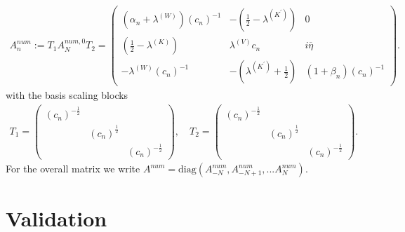 \documentclass[12pt,journal,compsoc, onecolumn]{IEEEtran}
\begin{document}
\begin{align}
    \label{eq:galerkin_matrix}
    {A}^{num}_n := T_1 A^{num, 0}_N T_2 = 
    \begin{pmatrix}
    (\alpha_n + \lambda^{(W)})(c_n)^{-1} & - (\frac{1}{2} - \lambda^{(K^\prime)}) & 0 \\
    (\frac{1}{2} -  \lambda^{(K)}) &  \lambda^{(V)}c_n & i \overline{\eta} \\ 
    -  \lambda^{(W)}(c_n)^{-1} & - ( \lambda^{(K^\prime)} + \frac{1}{2}) & (1 + \beta_n)(c_n)^{-1}
\end{pmatrix}.
\end{align}
with the basis scaling blocks \begin{align}
    T_1 = 
    \begin{pmatrix}
    (c_n)^{-\frac{1}{2}} & & \\
    &  (c_n)^{\frac{1}{2}} & \\
    & &  (c_n)^{-\frac{1}{2}}
    \end{pmatrix}, \quad
    T_2 = 
    \begin{pmatrix}
    (c_n)^{-\frac{1}{2}} & & \\
    &  (c_n)^{\frac{1}{2}} & \\
    & &  (c_n)^{-\frac{1}{2}}
    \end{pmatrix}. 
    \nonumber
\end{align}
For the overall matrix we write $A^{num} = \mathrm{diag}(A_{-N}^{num}, A_{-N + 1}^{num}, ... A_{N}^{num})$.
\section{Validation}
\end{document}
